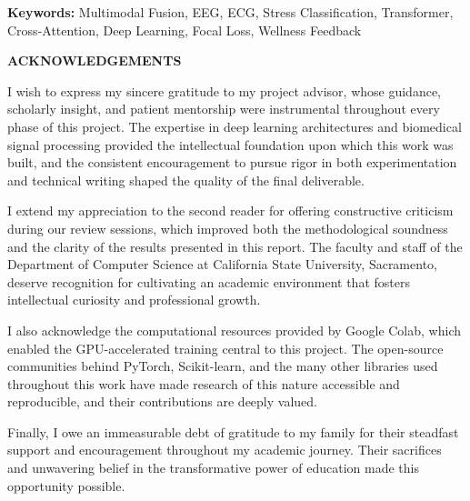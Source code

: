 \documentclass[12pt,letterpaper]{report}
\newcommand{\keywords}[1]{\par\addvspace\baselineskip\noindent\textbf{Keywords:} #1}
\begin{document}
\keywords{Multimodal Fusion, EEG, ECG, Stress Classification, Transformer, Cross-Attention, Deep Learning, Focal Loss, Wellness Feedback}

\clearpage
\begin{center}
{\large\bfseries ACKNOWLEDGEMENTS}
\end{center}

\vspace{0.5in}

I wish to express my sincere gratitude to my project advisor, whose guidance, scholarly insight, and patient mentorship were instrumental throughout every phase of this project. The expertise in deep learning architectures and biomedical signal processing provided the intellectual foundation upon which this work was built, and the consistent encouragement to pursue rigor in both experimentation and technical writing shaped the quality of the final deliverable.

I extend my appreciation to the second reader for offering constructive criticism during our review sessions, which improved both the methodological soundness and the clarity of the results presented in this report. The faculty and staff of the Department of Computer Science at California State University, Sacramento, deserve recognition for cultivating an academic environment that fosters intellectual curiosity and professional growth.

I also acknowledge the computational resources provided by Google Colab, which enabled the GPU-accelerated training central to this project. The open-source communities behind PyTorch, Scikit-learn, and the many other libraries used throughout this work have made research of this nature accessible and reproducible, and their contributions are deeply valued.

Finally, I owe an immeasurable debt of gratitude to my family for their steadfast support and encouragement throughout my academic journey. Their sacrifices and unwavering belief in the transformative power of education made this opportunity possible.

\clearpage
\tableofcontents

\clearpage
\listoftables
\end{document}

